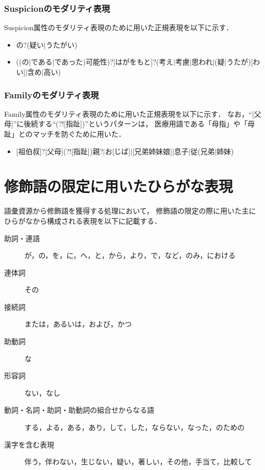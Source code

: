 \documentclass[japanese]{jnlp_1.4}
\begin{document}
\subsubsection*{Suspicionのモダリティ表現}

Suspicion属性のモダリティ表現のために用いた正規表現を以下に示す．
\begin{itemize}
\item {\small の?(疑い$|$うたがい)}
\item {\small ((の$|$である$|$であった)可能性)?[はがをもと]?(考え$|$考慮$|$思われ$|$(疑$|$うたが)[わい]$|$含め$|$高い)}
\end{itemize}

\subsubsection*{Familyのモダリティ表現}

Family属性のモダリティ表現のために用いた正規表現を以下に示す．
なお，``[父母]''に後続する``(?![指趾])''というパターンは，
医療用語である「母指」や「母趾」とのマッチを防ぐために用いた．
\begin{itemize}
\item {\small [祖伯叔]?[父母](?![指趾])親?$|$お[じば]$|$[兄弟姉妹娘]$|$息子$|$従(兄弟$|$姉妹)}
\end{itemize}


\section{修飾語の限定に用いたひらがな表現}
\label{sec:mdfy_restrict}

語彙資源から修飾語を獲得する処理において，
修飾語の限定の際に用いた主にひらがなから構成される表現を以下に記載する．
\begin{description}
 \item[助詞・連語] が，の，を，に，へ，と，から，より，で，など，のみ，における
 \item[連体詞] その
 \item[接続詞] または，あるいは，および，かつ
 \item[助動詞] な
 \item[形容詞] ない，なし
 \item[動詞・名詞・助詞・助動詞の組合せからなる語] する，よる，ある，あり，して，した，ならない，なった，のための
 \item[漢字を含む表現] 伴う，伴わない，生じない，疑い，著しい，その他，手当て，比較して
\end{description}
\end{document}
